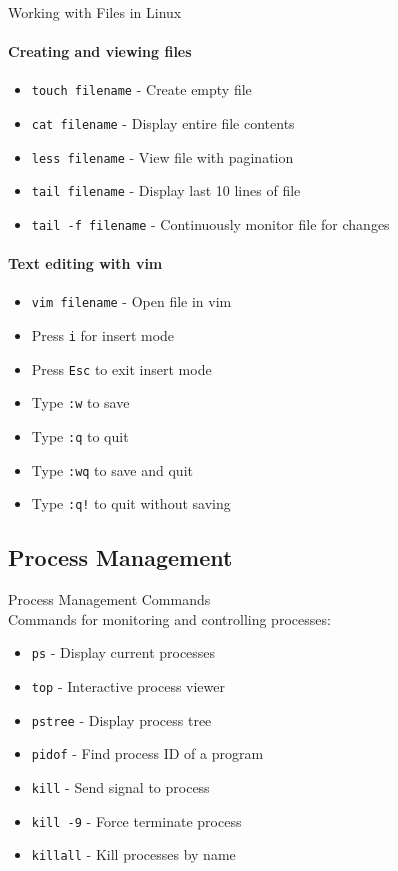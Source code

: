 \begin{KR}{Working with Files in Linux}\\
    \paragraph{Creating and viewing files}
    \begin{itemize}
        \item \texttt{touch filename} - Create empty file
        \item \texttt{cat filename} - Display entire file contents
        \item \texttt{less filename} - View file with pagination
        \item \texttt{tail filename} - Display last 10 lines of file
        \item \texttt{tail -f filename} - Continuously monitor file for changes
    \end{itemize}
    
    \paragraph{Text editing with vim}
    \begin{itemize}
        \item \texttt{vim filename} - Open file in vim
        \item Press \texttt{i} for insert mode
        \item Press \texttt{Esc} to exit insert mode
        \item Type \texttt{:w} to save
        \item Type \texttt{:q} to quit
        \item Type \texttt{:wq} to save and quit
        \item Type \texttt{:q!} to quit without saving
    \end{itemize}
\end{KR}

\subsection{Process Management}

\begin{definition}{Process Management Commands}\\
    Commands for monitoring and controlling processes:
    \begin{itemize}
        \item \texttt{ps} - Display current processes
        \item \texttt{top} - Interactive process viewer
        \item \texttt{pstree} - Display process tree
        \item \texttt{pidof} - Find process ID of a program
        \item \texttt{kill} - Send signal to process
        \item \texttt{kill -9} - Force terminate process
        \item \texttt{killall} - Kill processes by name
    \end{itemize}
\end{definition}

